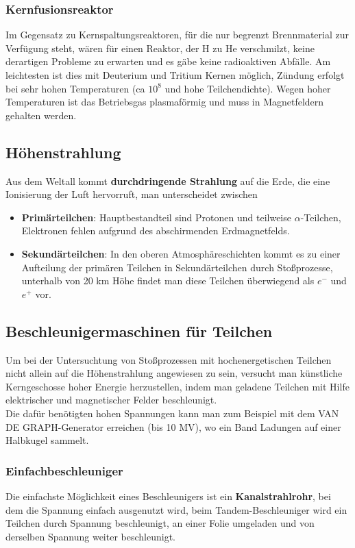 \documentclass[12pt,a4paper,ngerman]{article}
\begin{document}
\subsubsection*{Kernfusionsreaktor}
Im Gegensatz zu Kernspaltungsreaktoren, für die nur begrenzt Brennmaterial zur Verfügung steht, wären für einen Reaktor, der H zu He verschmilzt, keine derartigen Probleme zu erwarten und es gäbe keine radioaktiven Abfälle. Am leichtesten ist dies mit Deuterium und Tritium Kernen möglich, Zündung erfolgt bei sehr hohen Temperaturen (ca $10^8$ und hohe Teilchendichte). Wegen hoher Temperaturen ist das Betriebsgas plasmaförmig und muss in Magnetfeldern gehalten werden. 


\subsection{Höhenstrahlung}
Aus dem Weltall kommt \textbf{durchdringende Strahlung} auf die Erde, die eine Ionisierung der Luft hervorruft, man unterscheidet zwischen
\begin{itemize}
\item \textbf{Primärteilchen}: Hauptbestandteil sind Protonen und teilweise $\alpha$-Teilchen, Elektronen fehlen aufgrund des abschirmenden Erdmagnetfelds.
\item \textbf{Sekundärteilchen}: In den oberen Atmosphäreschichten kommt es zu einer Aufteilung der primären Teilchen in Sekundärteilchen durch Stoßprozesse, unterhalb von 20 km Höhe findet man diese Teilchen überwiegend als $e^-$ und $e^+$ vor. 
\end{itemize}


\subsection{Beschleunigermaschinen für Teilchen}
Um bei der Untersuchtung von Stoßprozessen mit hochenergetischen Teilchen nicht allein auf die Höhenstrahlung angewiesen zu sein, versucht man künstliche Kerngeschosse hoher Energie herzustellen, indem man geladene Teilchen mit Hilfe elektrischer und magnetischer Felder beschleunigt. \\
Die dafür benötigten hohen Spannungen kann man zum Beispiel mit dem VAN DE GRAPH-Generator erreichen (bis 10 MV), wo ein Band Ladungen auf einer Halbkugel sammelt.
\subsubsection*{Einfachbeschleuniger}
Die einfachste Möglichkeit eines Beschleunigers ist ein \textbf{Kanalstrahlrohr}, bei dem die Spannung einfach ausgenutzt wird, beim Tandem-Beschleuniger wird ein Teilchen durch Spannung beschleunigt, an einer Folie umgeladen und von derselben Spannung weiter beschleunigt. 
\end{document}
